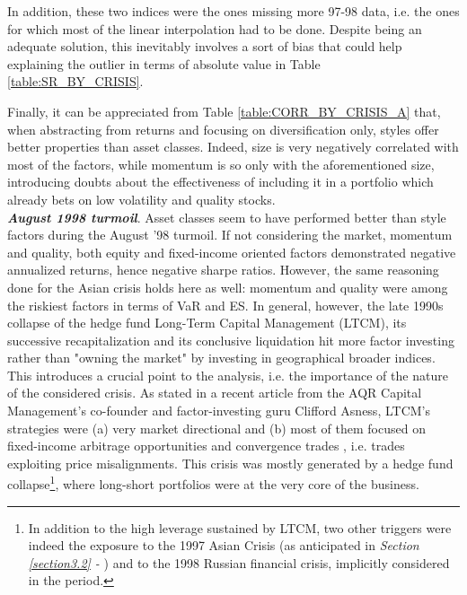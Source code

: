 \documentclass[12pt]{article}
\begin{document}
In addition, these two indices were the ones missing more 97-98 data, i.e. the ones for which most of the linear interpolation had to be done. Despite being an adequate solution, this inevitably involves a sort of bias that could help explaining the outlier in terms of absolute value in Table \ref{table:SR_BY_CRISIS}.

Finally, it can be appreciated from Table \ref{table:CORR_BY_CRISIS_A} that, when abstracting from returns and focusing on diversification only, styles offer better properties than asset classes. Indeed, size is very negatively correlated with most of the factors, while momentum is so only with the aforementioned size, introducing doubts about the effectiveness of including it in a portfolio which already bets on low volatility and quality stocks. \\

\textit{\textbf{August 1998 turmoil}}. Asset classes seem to have performed better than style factors during the August '98 turmoil. If not considering the market, momentum and quality, both equity and fixed-income oriented factors demonstrated negative annualized returns, hence negative sharpe ratios. However, the same reasoning done for the Asian crisis holds here as well: momentum and quality were among the riskiest factors in terms of VaR and ES. In general, however, the late 1990s collapse of the hedge fund Long-Term Capital Management (LTCM), its successive recapitalization and its conclusive liquidation hit more factor investing rather than "owning the market" by investing in geographical broader indices. This introduces a crucial point to the analysis, i.e. the importance of the nature of the considered crisis. As stated in a recent article from the AQR Capital Management's co-founder and factor-investing guru Clifford Asness, LTCM's strategies were (a) very market directional and (b) most of them focused on fixed-income arbitrage opportunities and convergence trades \cite{cliff_august1998}, i.e. trades exploiting price misalignments. This crisis was mostly generated by a hedge fund collapse\footnote{In addition to the high leverage sustained by LTCM, two other triggers were indeed the exposure to the 1997 Asian Crisis (as anticipated in \textit{Section \ref{section3.2} - }) and to the 1998 Russian financial crisis, implicitly considered in the period.}, where long-short portfolios were at the very core of the business.
\end{document}
